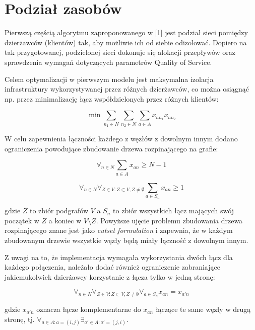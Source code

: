 \section{Podział zasobów}

Pierwszą częścią algorytmu zaproponowanego w [1] jest podział sieci pomiędzy dzierżawców (klientów) tak, aby możliwie ich od siebie odizolować. Dopiero na tak przygotowanej, podzielonej sieci dokonuje się alokacji przepływów oraz sprawdzenia wymagań dotyczących parametrów Quality of Service. \newline

Celem optymalizacji w pierwszym modelu jest maksymalna izolacja infrastruktury wykorzystywanej przez różnych dzierżawców, co można osiągnąć np. przez minimalizację łącz współdzielonych przez różnych klientów:

\begin{equation}
  \min \sum_{n_{1} \in N} \sum_{n_{2} \in N} \sum_{a \in A} x_{an_{1}} x_{an_{2}}
\end{equation}

W celu zapewnienia łączności każdego z węzłów z dowolnym innym dodano ograniczenia powodujące zbudowanie drzewa rozpinającego na grafie:

\begin{equation}
  \forall_{n \in N} \sum_{a \in A} x_{an} \ge N-1
\end{equation}

\begin{equation}
  \forall_{n \in N} \forall_{Z \in V: Z \subset V, Z \neq \emptyset } \sum_{a \in S_{n}} x_{an} \ge 1
\end{equation}

gdzie $Z$ to zbiór podgrafów $V$ a $S_{n}$ to zbiór wszystkich łącz mających swój początek w $Z$ a koniec w $V \setminus Z$. Powyższe ujęcie problemu zbudowania drzewa rozpinającego znane jest jako \textit{cutset formulation} i zapewnia, że w każdym zbudowanym drzewie wszystkie węzły będą miały łączność z dowolnym innym.

Z uwagi na to, że implementacja wymagała wykorzystania dwóch łącz dla każdego połączenia, należało dodać również ograniczenie zabraniające jakiemukolwiek dzierżawcy korzystanie z łącza tylko w jedną stronę:

\begin{equation}
  \forall_{n \in N} \forall_{Z \in V: Z \subset V, Z \neq \emptyset } \forall_{a \in S_{n}} x_{an} = x_{a'n}
\end{equation}

gdzie $x_{a'n}$ oznacza łącze komplementarne do $x_{an}$ łączące te same węzły w drugą stronę, tj. $\forall_{a \in A: a = (i,j)} \exists_{a' \in A: a' = (j,i)}$.
